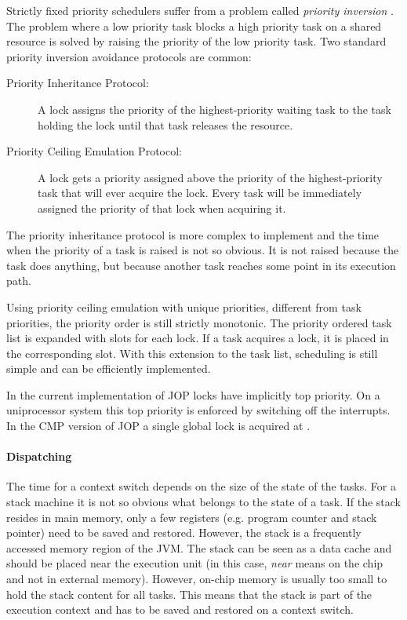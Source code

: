 Strictly fixed priority schedulers suffer from a problem called
\emph{priority inversion} \cite{626613}. The problem where a low
priority task blocks a high priority task on a shared resource is
solved by raising the priority of the low priority task. Two standard
priority inversion avoidance protocols are common:
%
\begin{description}
    \item[Priority Inheritance Protocol:] A lock assigns the
        priority of the highest-priority waiting task to the task
        holding the lock until that task releases the resource.

    \item[Priority Ceiling Emulation Protocol:] A lock gets a
        priority assigned above the priority of the
        highest-priority task that will ever acquire the lock.
        Every task will be immediately assigned the priority of
        that lock when acquiring it.
\end{description}
%
The priority inheritance protocol is more complex to implement and
the time when the priority of a task is raised is not so obvious. It
is not raised because the task does anything, but because another
task reaches some point in its execution path.

Using priority ceiling emulation with unique priorities, different
from task priorities, the priority order is still strictly monotonic.
The priority ordered task list is expanded with slots for each lock.
If a task acquires a lock, it is placed in the corresponding slot.
With this extension to the task list, scheduling is still simple and
can be efficiently implemented.

In the current implementation of JOP locks have implicitly top
priority. On a uniprocessor system this top priority is enforced by
switching off the interrupts. In the CMP version of JOP a single
global lock is acquired at . 

\paragraph{Dispatching}


The time for a context switch depends on the size of the state of the
tasks. For a stack machine it is not so obvious what belongs to the
state of a task. If the stack resides in main memory, only a few
registers (e.g. program counter and stack pointer) need to be saved
and restored. However, the stack is a frequently accessed memory
region of the JVM. The stack can be seen as a data cache and should
be placed near the execution unit (in this case, \emph{near} means on
the chip and not in external memory). However, on-chip memory is
usually too small to hold the stack content for all tasks. This means
that the stack is part of the execution context and has to be saved
and restored on a context switch.

